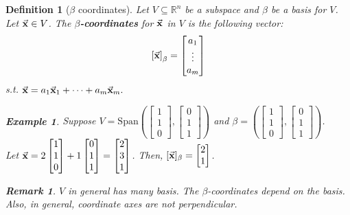 \documentclass[12pt, a4paper]{article}
\newtheorem{df}{Definition}[subsection]
\newtheorem{eg}{Example}[subsection]
\newtheorem*{rmk}{\indent Remark}
\def\R{{\mathbb{R}}}
\def\Span{\mathrm{Span}}
\def\vecx{\va{x}}
\begin{document}
\begin{df}[$\beta$ coordinates]
	Let	$V\subseteq\R^n$ be a subspace and $\beta$ be a basis for $V$. Let $\vecx\in V$. The $\beta$\textbf{-coordinates} for $\vecx$ in $V$ is the following vector: \[\left[\vecx\right]_\beta=\begin{bmatrix}a_1\\\vdots\\a_m\end{bmatrix}\] \emph{s.t.} $\vecx=a_1\vecx_1+\cdots+a_m\vecx_m.$
	\begin{eg}
		Suppose $V=\Span\left(\begin{bmatrix}1\\1\\0\end{bmatrix},\begin{bmatrix}0\\1\\1\end{bmatrix}\right)$ and $\beta=\left(\begin{bmatrix}1\\1\\0\end{bmatrix}, \begin{bmatrix}0\\1\\1\end{bmatrix}\right)$.\\
		Let $\vecx=2\begin{bmatrix}1\\1\\0\end{bmatrix}+1\begin{bmatrix}0\\1\\1\end{bmatrix}=\begin{bmatrix}2\\3\\1\end{bmatrix}$. 
		Then, $[\vecx]_\beta=\begin{bmatrix}2\\1\end{bmatrix}$.
	\end{eg}
	\begin{rmk} 
		$V$ in general has many basis. The $\beta$-coordinates depend on the basis. Also, in general, coordinate axes are not perpendicular. 
	\end{rmk}
\end{df}
\end{document}
